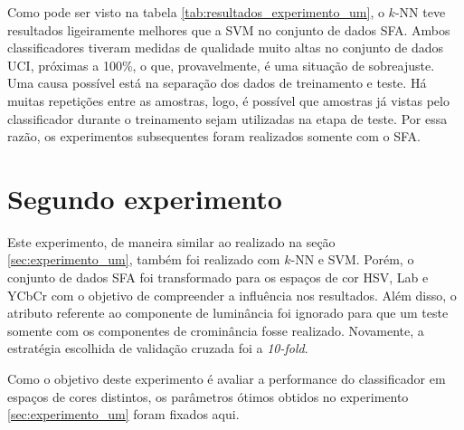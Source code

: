 Como pode ser visto na tabela \ref{tab:resultados_experimento_um}, o $k$-NN teve resultados ligeiramente melhores que a SVM no conjunto de dados SFA. Ambos classificadores tiveram medidas de qualidade muito altas no conjunto de dados UCI, próximas a 100\%, o que, provavelmente, é uma situação de sobreajuste. Uma causa possível está na separação dos dados de treinamento e teste. Há muitas repetições entre as amostras, logo, é possível que amostras já vistas pelo classificador durante o treinamento sejam utilizadas na etapa de teste. Por essa razão, os experimentos subsequentes foram realizados somente com o SFA.

\section{Segundo experimento}
\label{sec:experimento_dois}
Este experimento, de maneira similar ao realizado na seção \ref{sec:experimento_um}, também foi realizado com $k$-NN e SVM. Porém, o conjunto de dados SFA foi transformado para os espaços de cor HSV, Lab e YCbCr com o objetivo de compreender a influência nos resultados. Além disso, o atributo referente ao componente de luminância foi ignorado para que um teste somente com os componentes de crominância fosse realizado. Novamente, a estratégia escolhida de validação cruzada foi a \emph{10-fold}.

Como o objetivo deste experimento é avaliar a performance do classificador em espaços de cores distintos, os parâmetros ótimos obtidos no experimento \ref{sec:experimento_um} foram fixados aqui.

